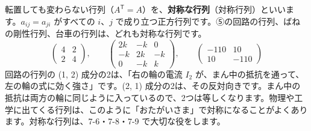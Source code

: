 \medskip
転置しても変わらない行列（$A^{\mathsf T}=A$）を、\textbf{対称な行列}（対称行列）といいます。$a_{ij}=a_{ji}$ がすべての $i$、$j$ で成り立つ正方行列です。⑤の回路の行列、ばねの剛性行列、台車の行列は、どれも対称な行列です。
\[ \begin{pmatrix} 4 & 2\\ 2 & 4 \end{pmatrix},\qquad \begin{pmatrix} 2k & -k & 0\\ -k & 2k & -k\\ 0 & -k & k \end{pmatrix},\qquad \begin{pmatrix} -110 & 10\\ 10 & -110 \end{pmatrix} \]
回路の行列の (1, 2) 成分の2は、「右の輪の電流 $I_2$ が、まん中の抵抗を通って、左の輪の式に効く強さ」です。(2, 1) 成分の2は、その反対向きです。まん中の抵抗は両方の輪に同じように入っているので、2つは等しくなります。物理や工学に出てくる行列は、このように「おたがいさま」で対称になることがよくあります。対称な行列は、7-6・7-8・7-9 で大切な役をします。

